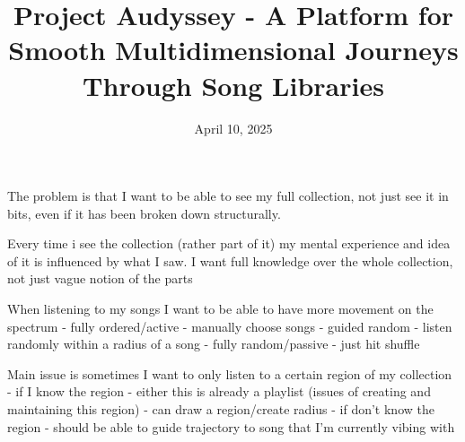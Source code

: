 \documentclass{src/ecsgdp}
\begin{document}
\frontmatter
\title{
    Project Audyssey - A Platform for Smooth Multidimensional Journeys Through Song Libraries
}
\date       {April 10, 2025}
\maketitle

\begin{abstract}

\end{abstract}



\tableofcontents
\listoffigures
\listoftables
\lstlistoflistings



\mainmatter



The problem is that I want to be able to see my full collection, not just see it in bits, even if it has been broken down structurally.

Every time i see the collection (rather part of it) my mental experience and idea of it is influenced by what I saw. I want full knowledge over the whole collection, not just vague notion of the parts

When listening to my songs I want to be able to have more movement on the spectrum
- fully ordered/active - manually choose songs
- guided random - listen randomly within a radius of a song
- fully random/passive - just hit shuffle

Main issue is sometimes I want to only listen to a certain region of my collection
- if I know the region
    - either this is already a playlist (issues of creating and maintaining this region)
    - can draw a region/create radius
- if don't know the region - should be able to guide trajectory to song that I'm currently vibing with
\end{document}
